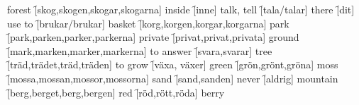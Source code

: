 \begin{questions}
    \begin{multicols}{2}
        \raggedcolumns
        \question forest \f[skog,skogen,skogar,skogarna]
        \question inside \f[inne]
        \question talk, tell \f[tala/talar]
        \question there \f[dit]
        \question use to \f[brukar/brukar] 
        \question basket \f[korg,korgen,korgar,korgarna]
        \question park \f[park,parken,parker,parkerna]
        \question private \f[privat,privat,privata]
        \question ground \f[mark,marken,marker,markerna]
        \question to answer \f[svara,svarar]
        \question tree \f[träd,trädet,träd,träden]
        \question to grow \f[växa, växer]
        \question green \f[grön,grönt,gröna]
        \question moss \f[mossa,mossan,mossor,mossorna]
        \question sand \f[sand,sanden]
        \question never \f[aldrig]
        \question mountain \f[berg,berget,berg,bergen]
        \question red \f[röd,rött,röda]
        \question berry
    \end{multicols}
\end{questions}